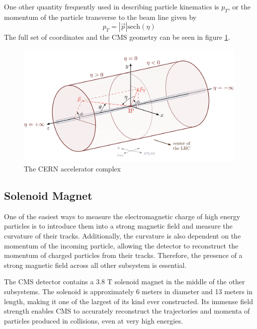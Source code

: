 One other quantity frequently used in describing particle kinematics is $p_T$, or the momentum of the particle transverse to the beam line given by
\begin{equation}
    p_T = |\vec{p}|\text{sech}(\eta)
\end{equation}
The full set of coordinates and the CMS geometry can be seen in figure \ref{fig:cms-coordinate-system}.

\begin{figure}[hb!]
    \centering
    \includegraphics[width=1.0\textwidth]{figures/chapter3/CMS-coordinate-system.png}
    \caption{The CERN accelerator complex}
    \label{fig:cms-coordinate-system}
\end{figure}



\subsection{Solenoid Magnet}

One of the easiest ways to measure the electromagnetic charge of high energy particles is to introduce them into a strong magnetic field and measure the curvature of their tracks. Additionally, the curvature is also dependent on the momentum of the incoming particle, allowing the detector to reconstruct the momentum of charged particles from their tracks. Therefore, the presence of a strong magnetic field across all other subsystem is essential. 

The CMS detector contains a 3.8 T solenoid magnet in the middle of the other subsystems. The solenoid is approximately 6 meters in diameter and 13 meters in length, making it one of the largest of its kind ever constructed. Its immense field strength enables CMS to accurately reconstruct the trajectories and momenta of particles produced in collisions, even at very high energies.

